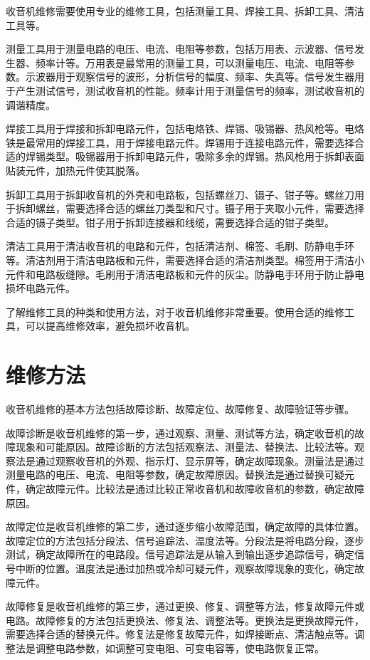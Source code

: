 \documentclass[12pt,UTF8]{ctexbook}
\begin{document}
收音机维修需要使用专业的维修工具，包括测量工具、焊接工具、拆卸工具、清洁工具等。

测量工具用于测量电路的电压、电流、电阻等参数，包括万用表、示波器、信号发生器、频率计等。万用表是最常用的测量工具，可以测量电压、电流、电阻等参数。示波器用于观察信号的波形，分析信号的幅度、频率、失真等。信号发生器用于产生测试信号，测试收音机的性能。频率计用于测量信号的频率，测试收音机的调谐精度。

焊接工具用于焊接和拆卸电路元件，包括电烙铁、焊锡、吸锡器、热风枪等。电烙铁是最常用的焊接工具，用于焊接电路元件。焊锡用于连接电路元件，需要选择合适的焊锡类型。吸锡器用于拆卸电路元件，吸除多余的焊锡。热风枪用于拆卸表面贴装元件，加热元件使其脱落。

拆卸工具用于拆卸收音机的外壳和电路板，包括螺丝刀、镊子、钳子等。螺丝刀用于拆卸螺丝，需要选择合适的螺丝刀类型和尺寸。镊子用于夹取小元件，需要选择合适的镊子类型。钳子用于拆卸连接器和线缆，需要选择合适的钳子类型。

清洁工具用于清洁收音机的电路和元件，包括清洁剂、棉签、毛刷、防静电手环等。清洁剂用于清洁电路板和元件，需要选择合适的清洁剂类型。棉签用于清洁小元件和电路板缝隙。毛刷用于清洁电路板和元件的灰尘。防静电手环用于防止静电损坏电路元件。

了解维修工具的种类和使用方法，对于收音机维修非常重要。使用合适的维修工具，可以提高维修效率，避免损坏收音机。

\section{维修方法}

收音机维修的基本方法包括故障诊断、故障定位、故障修复、故障验证等步骤。

故障诊断是收音机维修的第一步，通过观察、测量、测试等方法，确定收音机的故障现象和可能原因。故障诊断的方法包括观察法、测量法、替换法、比较法等。观察法是通过观察收音机的外观、指示灯、显示屏等，确定故障现象。测量法是通过测量电路的电压、电流、电阻等参数，确定故障原因。替换法是通过替换可疑元件，确定故障元件。比较法是通过比较正常收音机和故障收音机的参数，确定故障原因。

故障定位是收音机维修的第二步，通过逐步缩小故障范围，确定故障的具体位置。故障定位的方法包括分段法、信号追踪法、温度法等。分段法是将电路分段，逐步测试，确定故障所在的电路段。信号追踪法是从输入到输出逐步追踪信号，确定信号中断的位置。温度法是通过加热或冷却可疑元件，观察故障现象的变化，确定故障元件。

故障修复是收音机维修的第三步，通过更换、修复、调整等方法，修复故障元件或电路。故障修复的方法包括更换法、修复法、调整法等。更换法是更换故障元件，需要选择合适的替换元件。修复法是修复故障元件，如焊接断点、清洁触点等。调整法是调整电路参数，如调整可变电阻、可变电容等，使电路恢复正常。
\end{document}
